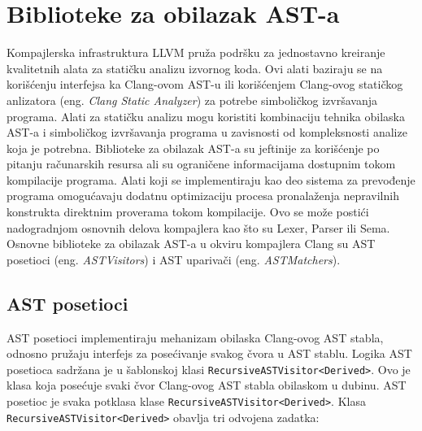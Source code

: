 \documentclass[12pt,oneside]{memoir}
\begin{document}
\section{Biblioteke za obilazak AST-a}

Kompajlerska infrastruktura LLVM pru\v{z}a podr\v{s}ku za jednostavno kreiranje kvalitetnih alata za stati\v{c}ku analizu izvornog koda. Ovi alati
baziraju se na kori\v{s}\'{c}enju interfejsa ka Clang-ovom AST-u ili kori\v{s}\'{c}enjem Clang-ovog stati\v{c}kog anlizatora (eng. \textit{Clang Static Analyzer}) za potrebe simboli\v{c}kog izvr\v{s}avanja programa. Alati za stati\v{c}ku analizu mogu koristiti kombinaciju tehnika obilaska AST-a i simboli\v{c}kog izvr\v{s}avanja programa u zavisnosti od kompleksnosti analize koja je potrebna. Biblioteke za obilazak AST-a su jeftinije za kori\v{s}\'{c}enje po pitanju ra\v{c}unarskih resursa ali su ograni\v{c}ene informacijama dostupnim tokom kompilacije programa. Alati koji se implementiraju kao deo sistema za prevođenje programa omogu\'{c}avaju dodatnu optimizaciju procesa pronala\v{z}enja nepravilnih konstrukta direktnim proverama tokom kompilacije. Ovo se mo\v{z}e posti\'{c}i nadogradnjom osnovnih delova kompajlera kao \v{s}to su Lexer, Parser ili Sema. \\Osnovne biblioteke za obilazak AST-a u okviru kompajlera Clang su AST posetioci (eng. \textit{ASTVisitors}) i  AST upariva\v{c}i (eng. \textit{ASTMatchers}).



\newtheorem{primer}{Primer}[section]

\subsection{AST posetioci}
AST posetioci implementiraju mehanizam obilaska Clang-ovog AST stabla, odnosno pru\v{z}aju interfejs
za pose\'{c}ivanje svakog \v{c}vora u AST stablu.
Logika AST posetioca sadr\v{z}ana je u šablonskoj klasi \lstinline{RecursiveASTVisitor<Derived>}.
Ovo je klasa koja posećuje svaki čvor Clang-ovog AST stabla obilaskom u dubinu.
AST posetioc je svaka potklasa klase \lstinline{RecursiveASTVisitor<Derived>}.
Klasa \lstinline{RecursiveASTVisitor<Derived>} obavlja tri odvojena zadatka:
\end{document}
